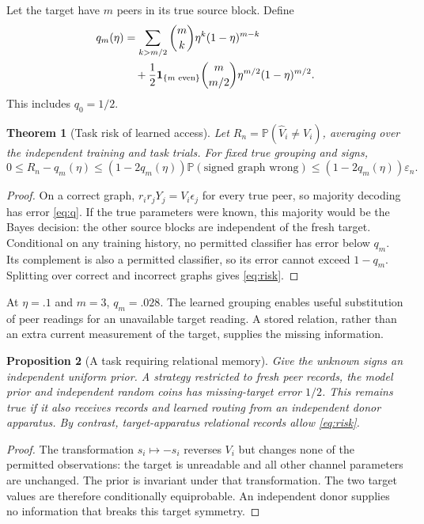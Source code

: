 \documentclass[11pt]{article}
\newtheorem{theorem}{Theorem}[section]
\newtheorem{proposition}[theorem]{Proposition}
\theoremstyle{definition}
\theoremstyle{remark}
\newcommand{\Prb}{\mathbb P}
\begin{document}
Let the target have $m$ peers in its true source block. Define
\begin{align}
 q_m(\eta)&=\sum_{k>m/2}\binom mk\eta^k(1-\eta)^{m-k}\notag\\
 &\quad+\frac12\mathbf1_{\{m\text{ even}\}}
 \binom m{m/2}\eta^{m/2}(1-\eta)^{m/2}.
 \label{eq:q}
\end{align}
This includes $q_0=1/2$.

\begin{theorem}[Task risk of learned access]
\label{thm:risk}
Let $R_n=\Prb(\widehat V_i\ne V_i)$, averaging over the independent training and task trials. For fixed true grouping and signs,
\begin{equation}
 0\le R_n-q_m(\eta)
 \le(1-2q_m(\eta))\Prb(\text{signed graph wrong})
 \le(1-2q_m(\eta))\varepsilon_n.
 \label{eq:risk}
\end{equation}
\end{theorem}
\begin{proof}
On a correct graph, $r_ir_jY_j=V_i\epsilon_j$ for every true peer, so majority decoding has error \eqref{eq:q}. If the true parameters were known, this majority would be the Bayes decision: the other source blocks are independent of the fresh target. Conditional on any training history, no permitted classifier has error below $q_m$. Its complement is also a permitted classifier, so its error cannot exceed $1-q_m$. Splitting over correct and incorrect graphs gives \eqref{eq:risk}.
\end{proof}

At $\eta=.1$ and $m=3$, $q_m=.028$. The learned grouping enables useful substitution of peer readings for an unavailable target reading. A stored relation, rather than an extra current measurement of the target, supplies the missing information.

\begin{proposition}[A task requiring relational memory]
\label{prop:memory}
Give the unknown signs an independent uniform prior. A strategy restricted to fresh peer records, the model prior and independent random coins has missing-target error $1/2$. This remains true if it also receives records and learned routing from an independent donor apparatus. By contrast, target-apparatus relational records allow \eqref{eq:risk}.
\end{proposition}
\begin{proof}
The transformation $s_i\mapsto-s_i$ reverses $V_i$ but changes none of the permitted observations: the target is unreadable and all other channel parameters are unchanged. The prior is invariant under that transformation. The two target values are therefore conditionally equiprobable. An independent donor supplies no information that breaks this target symmetry.
\end{proof}
\end{document}
